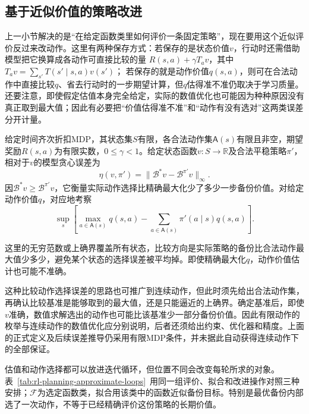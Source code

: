 \subsection{基于近似价值的策略改进}
\label{sec:rl-planning-approximate-improvement}

上一小节解决的是“在给定函数类里如何评价一条固定策略”，现在要用这个近似评价反过来改动作。这里有两种保存方式：若保存的是状态价值$v$，行动时还需借助模型把它换算成各动作可直接比较的量
$R(s,a)+\gamma T_av$，其中$T_av=\sum_{s'}T(s'\mid s,a)v(s')$；
若保存的就是动作价值$q(s,a)$，则可在合法动作中直接比较$q$、省去行动时的一步期望计算，但$q$估得准不准仍取决于学习质量。还要注意，即使假定估值本身完全给定，实际的数值优化也可能因为种种原因没有真正取到最大值；因此有必要把“价值估得准不准”和“动作有没有选对”这两类误差分开计量。

\begin{definition}[近似贪心误差]
 \label{def:rl-planning-greedy-error}
 给定时间齐次折扣MDP，其状态集$S$有限，各合法动作集$\mathsf A(s)$有限且非空，期望奖励$R(s,a)$为有限实数，$0\leq\gamma<1$。给定状态函数$v:S\to\mathbb R$及合法平稳策略$\pi'$，相对于$v$的模型贪心误差为
 \[
 \eta(v,\pi')=\lVert \mathcal B^*v-\mathcal B^{\pi'}v\rVert_\infty.
 \]
 因$\mathcal B^*v\geq \mathcal B^{\pi'}v$，它衡量实际动作选择比精确最大化少了多少一步备份价值。对给定动作价值$q$，对应地考察
 \[
  \sup_s\left[\max_{a\in\mathsf A(s)}q(s,a)-\sum_{a\in\mathsf A(s)}\pi'(a\mid s)q(s,a)\right].
 \]
\end{definition}

这里的无穷范数或上确界覆盖所有状态，比较方向是实际策略的备份比合法动作最大值少多少，避免某个状态的选择误差被平均掉。即使精确最大化$q$，动作价值估计也可能不准确。

这种比较动作选择误差的思路也可推广到连续动作，但此时须先给出合法动作集，再确认比较基准是能够取到的最大值，还是只能逼近的上确界。确定基准后，即使$v$准确，数值求解选出的动作也可能比该基准少一部分备份价值。因此有限动作的枚举与连续动作的数值优化应分别说明，后者还须给出约束、优化器和精度。上面的正式定义及后续误差推导仍采用有限MDP条件，并未据此自动获得连续动作下的全部保证。

估值和动作选择都可以放进迭代循环，但位置不同会改变每轮所求的对象。表~\ref{tab:rl-planning-approximate-loops}~用同一组评价、拟合和改进操作对照三种安排；$\mathcal F$为选定函数类，拟合用该类中的函数近似备份目标。特别是最优备份内部选了一次动作，不等于已经精确评价这份策略的长期价值。

